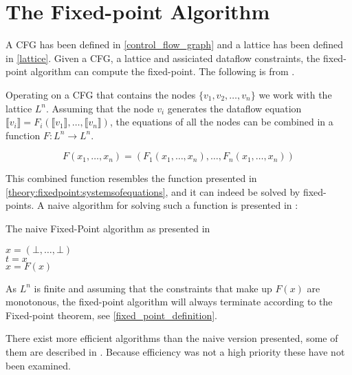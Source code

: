 \section{The Fixed-point Algorithm}\label{fixed_point_algorithm}
A CFG has been defined in \cref{control_flow_graph} and a lattice has been defined in \cref{lattice}.
Given a CFG, a lattice and assiciated dataflow constraints, the fixed-point algorithm can compute the fixed-point.
The following is from \citet{schwartzbach}.

Operating on a CFG that contains the nodes $\{ v_1, v_2, \dots, v_n \}$ we work with the lattice $L^n$.
Assuming that the node $v_i$ generates the dataflow equation $\llbracket v_i \rrbracket = F_i ( \llbracket v_1 \rrbracket, \dots, \llbracket v_n \rrbracket)$, the equations of all the nodes can be combined in a function $ F: L^n \rightarrow L^n$.

\[ F(x_1, \dots, x_n) = (F_1(x_1, \dots, x_n), \dots, F_n(x_1, \dots, x_n)) \]

This combined function resembles the function presented in \cref{theory:fixedpoint:systemsofequations}, and it can indeed be solved by fixed-points.
A naive algorithm for solving such a function is presented in \citet{schwartzbach}:

\begin{algorithm}
  \caption{The naive Fixed-Point algorithm as presented in \citet[p.18~]{schwartzbach}}\label{fixed-point_algo}  
  \DontPrintSemicolon
  $x = (\bot, \dots, \bot)$ \\
         {
           $t = x$\\
           $x = F(x)$
         }
\end{algorithm}

As $L^n$ is finite and assuming that the constraints that make up $F(x)$ are monotonous, the fixed-point algorithm will always terminate according to the Fixed-point theorem, see \cref{fixed_point_definition}.

There exist more efficient algorithms than the naive version presented, some of them are described in \citet[p.~18]{schwarzbach}.
Because efficiency was not a high priority these have not been examined.
